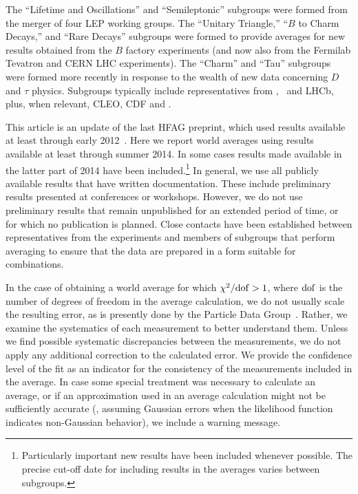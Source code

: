 The ``Lifetime and Oscillations'' and ``Semileptonic'' subgroups were formed from the merger of four LEP working groups.
The ``Unitary Triangle,'' ``$B$ to Charm Decays,'' and ``Rare Decays''
subgroups were formed to provide averages for new results obtained
from the $B$ factory experiments (and now also from the Fermilab 
Tevatron and CERN LHC experiments).
The ``Charm'' and ``Tau''  subgroups were formed more recently in 
response to the wealth of new data concerning $D$ and $\tau$ physics. 
Subgroups typically include representatives from \belle, \babar\ and LHCb, 
plus, when relevant, CLEO, CDF and \dzero. 

This article is an update of the last HFAG preprint,
which used results available at least through early 2012~\cite{Amhis:2012bh}. 
Here we report world averages using results available at least through summer 2014.
In some cases results made available in the latter part of 2014 have been
included.\footnote{
  Particularly important new results have been included whenever possible.
  The precise cut-off date for including results in the averages varies 
  between subgroups.
}
In general, we use all publicly available results that have written documentation. 
These include preliminary results presented at conferences or workshops.
However, we do not use preliminary results that remain unpublished 
for an extended period of time, or for which no publication is planned. 
Close contacts have been established between representatives from
the experiments and members of subgroups that perform averaging 
to ensure that the data are prepared in a form suitable for 
combinations.  

In the case of obtaining a world average for which $\chi^2/{\rm dof} > 1$,
where ${\rm dof}$ is the number of degrees of freedom in the average
calculation, we do not usually scale the resulting error, as is presently 
done by the Particle Data Group~\cite{PDG_2014}.
Rather, 
we examine the systematics of each measurement to better understand them. 
Unless we find possible systematic discrepancies between the measurements, 
we do not apply any additional correction to the calculated error. 
We provide the confidence level of the fit as an indicator for the 
consistency of the measurements included in the average. In case some
special treatment was necessary to calculate an average, or if an
approximation used in an average calculation might not be 
sufficiently accurate 
(\eg, assuming Gaussian errors when the likelihood function indicates 
non-Gaussian behavior), we include a warning message.

